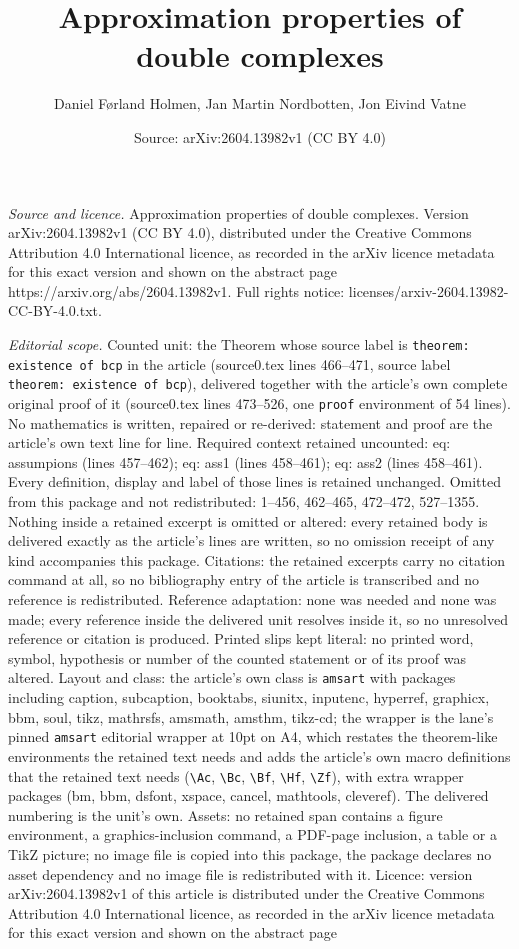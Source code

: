 \documentclass[10pt,a4paper]{amsart}
\title[Approximation properties of double complexes]{Approximation properties of double complexes}
\author{Daniel F{\o}rland Holmen, Jan Martin Nordbotten, Jon Eivind Vatne}
\date{Source: arXiv:2604.13982v1 (CC BY 4.0)}
\begin{document}
\maketitle

\noindent\emph{Source and licence.} Approximation properties of double complexes. Version arXiv:2604.13982v1 (CC BY 4.0), distributed under the Creative Commons Attribution 4.0 International licence, as recorded in the arXiv licence metadata for this exact version and shown on the abstract page https://arxiv.org/abs/2604.13982v1. Full rights notice: licenses/arxiv-2604.13982-CC-BY-4.0.txt.\par\smallskip

\noindent\textit{Editorial scope.} Counted unit: the Theorem whose source label is \texttt{theorem: existence of bcp} in the article (source0.tex lines 466--471, source label \texttt{theorem: existence of bcp}), delivered together with the article's own complete original proof of it (source0.tex lines 473--526, one \texttt{proof} environment of 54 lines). No mathematics is written, repaired or re-derived: statement and proof are the article's own text line for line. Required context retained uncounted: eq: assumpions (lines 457--462); eq: ass1 (lines 458--461); eq: ass2 (lines 458--461). Every definition, display and label of those lines is retained unchanged. Omitted from this package and not redistributed: 1--456, 462--465, 472--472, 527--1355. Nothing inside a retained excerpt is omitted or altered: every retained body is delivered exactly as the article's lines are written, so no omission receipt of any kind accompanies this package. Citations: the retained excerpts carry no citation command at all, so no bibliography entry of the article is transcribed and no reference is redistributed. Reference adaptation: none was needed and none was made; every reference inside the delivered unit resolves inside it, so no unresolved reference or citation is produced. Printed slips kept literal: no printed word, symbol, hypothesis or number of the counted statement or of its proof was altered. Layout and class: the article's own class is \texttt{amsart} with packages including caption, subcaption, booktabs, siunitx, inputenc, hyperref, graphicx, bbm, soul, tikz, mathrsfs, amsmath, amsthm, tikz-cd; the wrapper is the lane's pinned \texttt{amsart} editorial wrapper at 10pt on A4, which restates the theorem-like environments the retained text needs and adds the article's own macro definitions that the retained text needs (\texttt{\textbackslash Ac}, \texttt{\textbackslash Bc}, \texttt{\textbackslash Bf}, \texttt{\textbackslash Hf}, \texttt{\textbackslash Zf}), with extra wrapper packages (bm, bbm, dsfont, xspace, cancel, mathtools, cleveref). The delivered numbering is the unit's own. Assets: no retained span contains a figure environment, a graphics-inclusion command, a PDF-page inclusion, a table or a TikZ picture; no image file is copied into this package, the package declares no asset dependency and no image file is redistributed with it. Licence: version arXiv:2604.13982v1 of this article is distributed under the Creative Commons Attribution 4.0 International licence, as recorded in the arXiv licence metadata for this exact version and shown on the abstract page 
\end{document}
